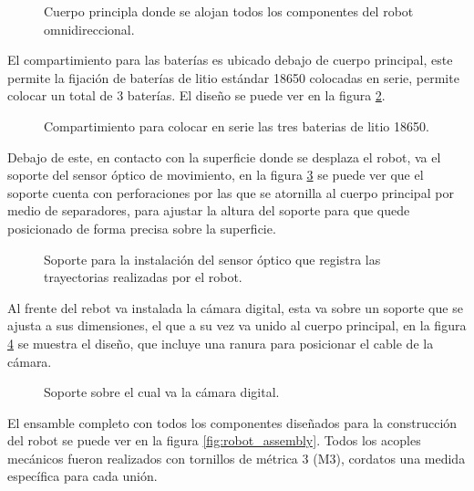 \documentclass{iccmemoria}
\begin{document}
\begin{figure}[H]
  \centering
  
  \caption{Cuerpo principla donde se alojan todos los componentes del robot omnidireccional.}
  \label{fig:frame}
\end{figure}

El compartimiento para las baterías es ubicado debajo de cuerpo principal, este permite la fijación de baterías de litio estándar 18650 colocadas en serie, permite colocar un total de 3 baterías. El diseño se puede ver en la figura \ref{fig:battery_compartment}.

\begin{figure}[H]
  \centering
  
  \caption{Compartimiento para colocar en serie las tres baterias de litio 18650.}
  \label{fig:battery_compartment}
\end{figure}

Debajo de este, en contacto con la superficie donde se desplaza el robot, va el soporte del sensor óptico de movimiento, en la figura \ref{fig:mouse_holder} se puede ver que el soporte cuenta con perforaciones por las que se atornilla al cuerpo principal por medio de separadores, para ajustar la altura del soporte para que quede posicionado de forma precisa sobre la superficie.\\

\begin{figure}[H]
  \centering
  
  \caption{Soporte para la instalación del sensor óptico que registra las trayectorias realizadas por el robot.}
  \label{fig:mouse_holder}
\end{figure}

Al frente del rebot va instalada la cámara digital, esta va sobre un soporte que se ajusta a sus dimensiones, el que a su vez va unido al cuerpo principal, en la figura \ref{fig:camera_holder} se muestra el diseño, que incluye una ranura para posicionar el cable de la cámara.\\

\begin{figure}[H]
  \centering
  
  \caption{Soporte sobre el cual va la cámara digital.}
  \label{fig:camera_holder}
\end{figure}

El ensamble completo con todos los componentes diseñados para la construcción del robot se puede ver en la figura \ref{fig:robot_assembly}. Todos los acoples mecánicos fueron realizados con tornillos de métrica 3 (M3), cordatos una medida específica para cada unión.
\end{document}
